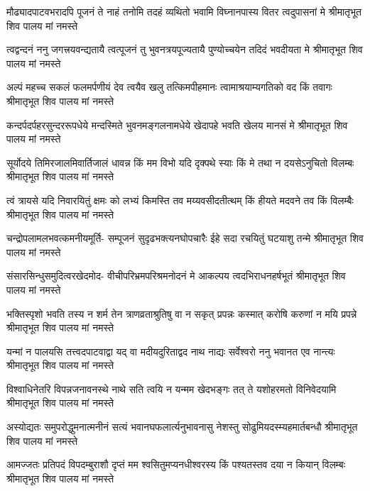 \fourlineindentedshloka
{मौढ्यादपाटवभरादपि पूजनं ते}
{नाहं तनोमि तदहं व्यथितो भवामि}
{विघ्नानपास्य वितर त्वदुपासनां मे}
{श्रीमातृभूत शिव पालय मां नमस्ते} %

\fourlineindentedshloka
{त्वद्वन्दनं ननु जगत्त्रयवन्द्यतायै}
{त्वत्पूजनं तु भुवनत्रयपूज्यतायै}
{पुण्योच्चयेन तदिदं भवदीयता मे}
{श्रीमातृभूत शिव पालय मां नमस्ते} %

\fourlineindentedshloka
{अल्पं महच्च सकलं फलमर्पणीयं}
{देव त्वयैव खलु तत्किमपीहमानः}
{त्वामाश्रयाम्यगतिको वद किं तवागः}
{श्रीमातृभूत शिव पालय मां नमस्ते} %

\fourlineindentedshloka
{कन्दर्पदर्पहरसुन्दररूपधेये}
{मन्दस्मिते भुवनमङ्गलनामधेये}
{खेदापहे भवति खेलय मानसं मे}
{श्रीमातृभूत शिव पालय मां नमस्ते} %

\fourlineindentedshloka
{सूर्योदये तिमिरजालमिवार्तिजालं}
{धावन्न किं मम विभो यदि दृक्पथे स्याः}
{किं मे तथा न दयसेऽनुचितो विलम्बः}
{श्रीमातृभूत शिव पालय मां नमस्ते} %

\fourlineindentedshloka
{त्वं त्रायसे यदि निवारयितुं क्षमः को}
{लभ्यं किमस्ति तव मय्यवसीदतीत्थम्}
{किं हीयते मदवने तव किं विलम्बैः}
{श्रीमातृभूत शिव पालय मां नमस्ते} %

\fourlineindentedshloka
{चन्द्रोपलामलभवत्कमनीयमूर्ति-}
{सम्पूजनं सुदृढभक्त्यनघोपचारैः}
{ईहे सदा रचयितुं घटयाशु तन्मे}
{श्रीमातृभूत शिव पालय मां नमस्ते} %

\fourlineindentedshloka
{संसारसिन्धुसमुदित्वरखेदमोद-}
{वीचीपरिभ्रमपरिश्रमनोदनं मे}
{आकल्पय त्वदभिराधनहर्षभूतं}
{श्रीमातृभूत शिव पालय मां नमस्ते} %

\fourlineindentedshloka
{भक्तिस्पृशो भवति तस्य न शर्म तेन}
{त्राणव्रताश्रुतिषु वा न सकृत् प्रपन्नः}
{कस्मात् करोषि करुणां न मयि प्रपन्ने}
{श्रीमातृभूत शिव पालय मां नमस्ते} %

\fourlineindentedshloka
{यन्मां न पालयसि तत्त्वदपाटवाद्वा}
{यद् वा मदीयदुरिताद्वद नाथ नाद्यः}
{सर्वेश्वरो ननु भवानत एव नान्त्यः}
{श्रीमातृभूत शिव पालय मां नमस्ते} %

\fourlineindentedshloka
{विश्वाधिनेतरि विपन्नजनावनस्थे}
{नाथे सति त्वयि न यन्मम खेदभङ्गः}
{तत् ते यशोहरमतो विनिवेदयामि}
{श्रीमातृभूत शिव पालय मां नमस्ते} %

\fourlineindentedshloka
{अस्योद्यतः समुपरोद्धुमनात्मनीनं}
{सत्यं भवानघफलार्त्यनुभावनासु}
{नेशस्तु सोढुमियदस्म्यहमार्तबन्धौ}
{श्रीमातृभूत शिव पालय मां नमस्ते} %

\fourlineindentedshloka
{आमज्जतः प्रतिपदं विपदम्बुराशौ}
{दृप्तं मम श्वसितुमप्यनधीश्वरस्य}
{किं पश्यतस्तव दया न कियान् विलम्बः}
{श्रीमातृभूत शिव पालय मां नमस्ते} %

